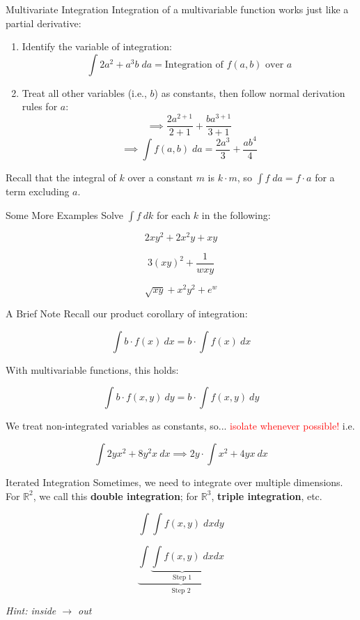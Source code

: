 \documentclass[10pt]{beamer}
\begin{document}
\begin{frame}{Multivariate Integration}
    Integration of a multivariable function works just like a partial derivative:

    \begin{enumerate}
        \item Identify the variable of integration:
        \[\int 2a^2 + a^3b \; da = \text{Integration of $f(a,b)$ over $a$}\]
        \item Treat all other variables (i.e., $b$) as constants, then follow normal derivation rules for $a$:
        \[\implies \frac{2a^{2+1}}{2+1} + \frac{ba^{3+1}}{3+1}\]
        \[\implies \int f(a,b) \; da = \frac{2a^3}{3} + \frac{ab^4}{4}\]
    \end{enumerate}
    Recall that the integral of $k$ over a constant $m$ is $k\cdot m$, so $\int f\; da = f \cdot a$ for a term excluding $a$.
\end{frame}

\begin{frame}{Some More Examples}
    Solve $\int f \: dk$ for each $k$ in the following:

    \[2xy^2 + 2x^2y + xy\]

    \[3(xy)^2 + \frac{1}{wxy}\]

    \[\sqrt{xy} + x^2 y^2 + e^w\]
\end{frame}

\begin{frame}{A Brief Note}
    Recall our product corollary of integration:

    \[\int b \cdot f(x) \: dx = b \cdot \int f(x) \: dx\]

    With multivariable functions, this holds:

    \[\int b \cdot f(x,y) \: dy = b \cdot \int f(x,y)\: dy\]

    We treat non-integrated variables as constants, so... \textcolor{red}{isolate whenever possible!} i.e.

    \[\int 2y x^2 + 8 y^2x \: dx  \implies 2y \cdot \int x^2 + 4yx \: dx \]
\end{frame}

\begin{frame}{Iterated Integration}
    Sometimes, we need to integrate over multiple dimensions. For $\mathbb{R}^2$, we call this \textbf{double integration}; for $\mathbb{R}^3$, \textbf{triple integration}, etc.

    \[\int \int f(x,y) \; dx dy\] \pause

    \[\underbrace{\int \underbrace{\int f(x,y) \; dx}_{\text{Step 1}} dx}_{\text{Step 2}}\]

    \textit{Hint: inside $\rightarrow$ out}

\end{frame}
\end{document}
